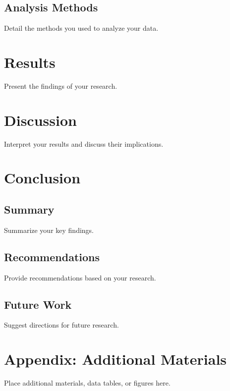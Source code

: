 \documentclass[12pt, letterpaper]{report}
\begin{document}
\section{Analysis Methods}
Detail the methods you used to analyze your data.

\chapter{Results}
Present the findings of your research.

\chapter{Discussion}
Interpret your results and discuss their implications.

\chapter{Conclusion}
\section{Summary}
Summarize your key findings.

\section{Recommendations}
Provide recommendations based on your research.

\section{Future Work}
Suggest directions for future research.

\appendix
\chapter{Appendix: Additional Materials}
Place additional materials, data tables, or figures here.



\end{document}
